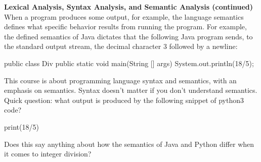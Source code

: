\begin{minipage}[t]{\sw}
\slidenumber
\LARGE
{\bf Lexical Analysis, Syntax Analysis, and Semantic Analysis (continued)}\exx
When a program produces some output, for example,
the language semantics defines what specific behavior results
from running the program.
For example, the defined semantics of Java dictates
that the following Java program sends,
to the standard output stream, the decimal character 3
followed by a newline:
\Large
\begin{qv}
public class Div {
    public static void main(String [] args) {
        System.out.println(18/5);
    }
}
\end{qv}
\LARGE
This course is about programming language syntax and semantics,
with an emphasis on semantics.
Syntax doesn't matter if you don't understand semantics.\exx
Quick question: what output is produced
by the following snippet of python3 code?
\begin{qv}
print(18/5)
\end{qv}
Does this say anything about how the semantics of Java and Python differ
when it comes to integer division?
\end{minipage}
\clearpage
